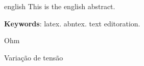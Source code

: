 \documentclass{TCC_UP}
\begin{document}
    \begin{resumo}[Abstract]
     \begin{otherlanguage*}{english}
       This is the english abstract.
       
       \textbf{Keywords}: latex. abntex. text editoration.
     \end{otherlanguage*}
    \end{resumo}

    \listoffigures*
    \cleardoublepage
    
    \listofgraficos*
    \cleardoublepage
    
    \listofquadros*
    \cleardoublepage
    
    \listoftables*
    \cleardoublepage
    
    \printnomenclature
    \cleardoublepage
    
    \begin{simbolos}
      \item[$ \Omega $] Ohm
      \item[$ \Delta V $] Variação de tensão
    \end{simbolos}

    \tableofcontents*
    \cleardoublepage
    
\end{document}
